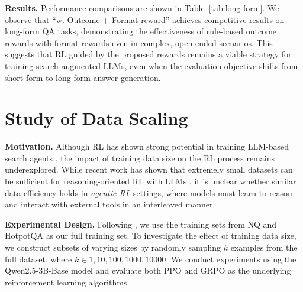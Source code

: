 \textbf{Results.}
Performance comparisons are shown in Table~\ref{tab:long-form}.
We observe that ``\Ours w. Outcome + Format reward'' achieves competitive results on long-form QA tasks, demonstrating the effectiveness of rule-based outcome rewards with format rewards even in complex, open-ended scenarios.
This suggests that RL guided by the proposed rewards remains a viable strategy for training search-augmented LLMs, even when the evaluation objective shifts from short-form to long-form answer generation.

\section{Study of Data Scaling}\label{apx:sec:data-scaling}

\textbf{Motivation.}
Although RL has shown strong potential in training LLM-based search agents \cite{jin2025search}, the impact of training data size on the RL process remains underexplored.
While recent work has shown that extremely small datasets can be sufficient for reasoning-oriented RL with LLMs \cite{wang2025reinforcement}, it is unclear whether similar data efficiency holds in \textit{agentic RL} settings, where models must learn to reason and interact with external tools in an interleaved manner.

\textbf{Experimental Design.}
Following \cite{jin2025search}, we use the training sets from NQ \cite{kwiatkowski2019natural} and HotpotQA \cite{yang2018hotpotqa} as our full training set.
To investigate the effect of training data size, we construct subsets of varying sizes by randomly sampling $k$ examples from the full dataset, where $k \in {1, 10, 100, 1000, 10000}$.
We conduct experiments using the Qwen2.5-3B-Base model and evaluate both PPO and GRPO as the underlying reinforcement learning algorithms.

